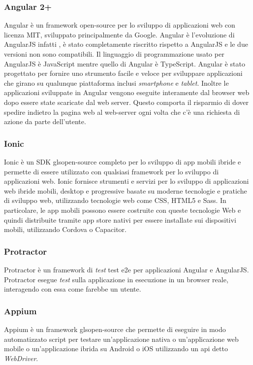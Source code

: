 \subsubsection*{Angular 2+}
Angular è un framework \gls{open-source}\ap{[g]} per lo sviluppo di applicazioni web con \gls{licenza MIT}\ap{[g]}, sviluppato principalmente da Google. Angular è l'evoluzione di AngularJS infatti , è stato completamente riscritto rispetto a AngularJS e le due versioni non sono compatibili. Il linguaggio di programmazione usato per AngularJS è JavaScript mentre quello di Angular è TypeScript. Angular è stato progettato per fornire uno strumento facile e veloce per sviluppare applicazioni che girano su qualunque piattaforma inclusi \emph{smartphone} e \emph{tablet}. Inoltre le applicazioni sviluppate in Angular vengono eseguite interamente dal \gls{browser web}\ap{[g]} dopo essere state scaricate dal web \gls{server}\ap{[g]}. Questo comporta il risparmio di dover spedire indietro la pagina web al web-server ogni volta che c'è una richiesta di azione da parte dell'utente. 

\subsubsection*{Ionic}
Ionic è un SDK gls{open-source}\ap{[g]} completo per lo sviluppo di app mobili ibride e permette di essere utilizzato con qualsiasi framework per lo sviluppo di applicazioni web. Ionic fornisce strumenti e servizi per lo sviluppo di applicazioni web ibride mobili, desktop e progressive basate su moderne tecnologie e pratiche di sviluppo web, utilizzando tecnologie web come CSS, HTML5 e Sass. In particolare, le app mobili possono essere costruite con queste tecnologie Web e quindi distribuite tramite app store nativi per essere installate sui dispositivi mobili, utilizzando Cordova o Capacitor. 

\subsubsection*{Protractor}
Protractor è un \gls{framework}\ap{[g]} di \emph{test} \gls{test e2e}\ap{[g]} per applicazioni Angular e AngularJS. Protractor esegue \emph{test} sulla applicazione in esecuzione in un browser reale, interagendo con essa come farebbe un utente.

\subsubsection*{Appium}
Appium è un \gls{framework}\ap{[g]} gls{open-source}\ap{[g]} che permette di eseguire in modo automatizzato script per testare un'\gls{applicazione nativa}\ap{[g]} o un'\gls{applicazione web mobile}\ap{[g]} o un'\gls{applicazione ibrida}\ap{[g]} su \gls{Android}\ap{[g]} o \gls{iOS}\ap{[g]} utilizzando un \gls{api}\ap{[g]} detto \emph{WebDriver}.

